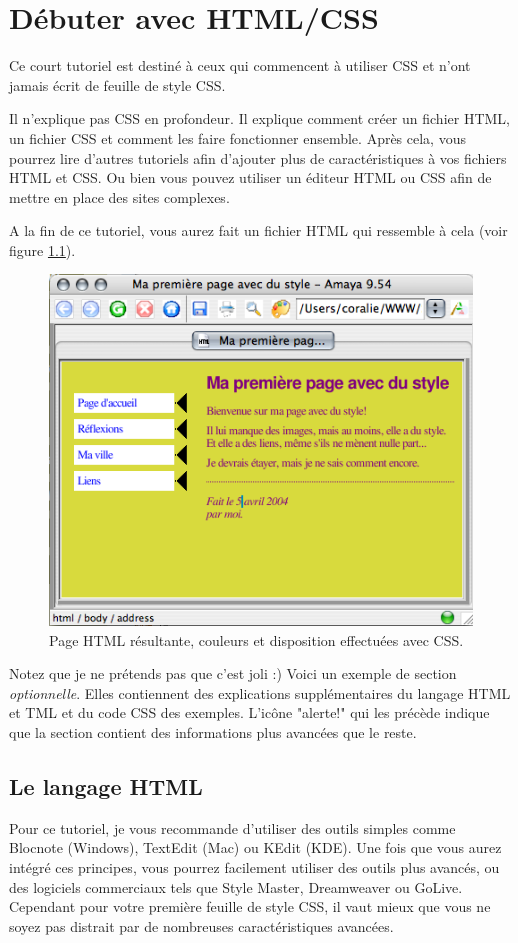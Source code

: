
\chapter{Débuter avec HTML/CSS}
Ce court tutoriel est destiné à  ceux qui commencent à  utiliser CSS et n'ont jamais écrit de feuille de style CSS.

Il n'explique pas CSS en profondeur. Il explique comment créer un fichier HTML, un fichier CSS et comment les faire fonctionner ensemble. Après cela, vous pourrez lire d'autres tutoriels afin d'ajouter plus de caractéristiques à  vos fichiers HTML et CSS. Ou bien vous pouvez utiliser un éditeur HTML ou CSS afin de mettre en place des sites complexes.

A la fin de ce tutoriel, vous aurez fait un fichier HTML qui ressemble à cela (voir figure \ref{fig:screen1}). 

\begin{figure}[h]
	\begin{center}
		\caption{Page HTML résultante, couleurs et disposition effectuées avec CSS.}
		\label{fig:screen1}
		\includegraphics{voronin/img/capture5.png}	
	\end{center}
\end{figure}
Notez que je ne prétends pas que c'est joli :)
Voici un exemple de section \emph{optionnelle}. Elles contiennent des explications supplémentaires du langage HTML et TML et du code CSS des exemples. L'icône "alerte!" qui les précède indique que la section contient des informations plus avancées que le reste.
\normalsize
\section{Le langage HTML}
Pour ce tutoriel, je vous recommande d'utiliser des outils simples comme Blocnote (Windows), TextEdit (Mac) ou KEdit (KDE). Une fois que vous aurez intégré ces principes, vous pourrez facilement utiliser des outils plus avancés, ou des logiciels commerciaux tels que Style Master, Dreamweaver ou GoLive. Cependant pour votre première feuille de style CSS, il vaut mieux que vous ne soyez pas distrait par de nombreuses caractéristiques avancées.


